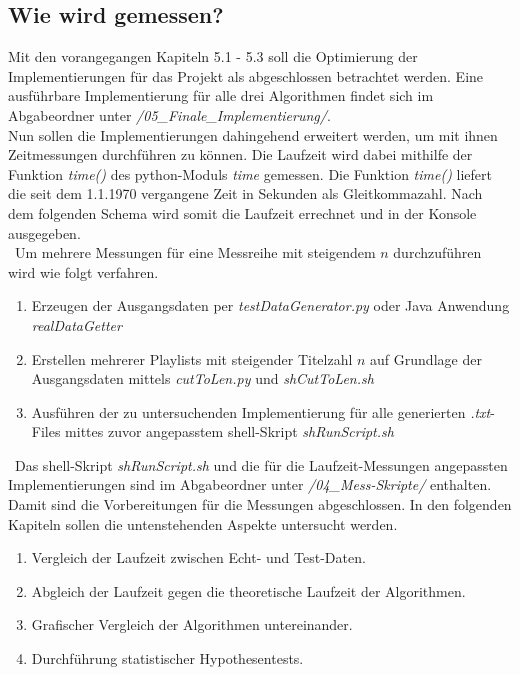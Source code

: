 \documentclass[
10pt, %
a4paper, %
oneside, %
headinclude,footinclude, %
BCOR5mm, %
]{scrartcl}
\begin{document}
\subsection{Wie wird gemessen?}
Mit den vorangegangen Kapiteln 5.1 - 5.3 soll die Optimierung der Implementierungen für das Projekt als abgeschlossen betrachtet werden. Eine ausführbare Implementierung für alle drei Algorithmen findet sich im Abgabeordner unter \textit{/05\_Finale\_Implementierung/}.\\ 
Nun sollen die Implementierungen dahingehend erweitert werden, um mit ihnen Zeitmessungen durchführen zu können.
Die Laufzeit wird dabei mithilfe der Funktion \textit{time() }des python-Moduls \textit{time} gemessen. Die Funktion \textit{time()} liefert die seit dem 1.1.1970 vergangene Zeit in Sekunden als Gleitkommazahl. \cite{TIME} Nach dem folgenden Schema wird somit die Laufzeit errechnet und in der Konsole ausgegeben.\\
\
Um mehrere Messungen für eine Messreihe mit steigendem \(n\) durchzuführen wird wie folgt verfahren.
\begin{enumerate}[noitemsep]
	\item Erzeugen der Ausgangsdaten per \textit{testDataGenerator.py} oder Java Anwendung \textit{realDataGetter}
	\item Erstellen mehrerer Playlists mit steigender Titelzahl \(n\) auf Grundlage der Ausgangsdaten mittels \textit{cutToLen.py} und \textit{shCutToLen.sh}
	\item Ausführen der zu untersuchenden Implementierung für alle generierten \textit{.txt}-Files mittes zuvor angepasstem shell-Skript \textit{shRunScript.sh}
\end{enumerate}\
Das shell-Skript \textit{shRunScript.sh} und die für die Laufzeit-Messungen angepassten Implementierungen sind im Abgabeordner unter \textit{/04\_Mess-Skripte/} enthalten.\\
Damit sind die Vorbereitungen für die Messungen abgeschlossen. In den folgenden Kapiteln sollen die untenstehenden Aspekte untersucht werden.
\begin{enumerate}[noitemsep]
		\item Vergleich der Laufzeit zwischen Echt- und Test-Daten.
		\item Abgleich der Laufzeit gegen die theoretische Laufzeit der Algorithmen.
		\item Grafischer Vergleich der Algorithmen untereinander.
		\item Durchführung statistischer Hypothesentests.
\end{enumerate}\
\end{document}
